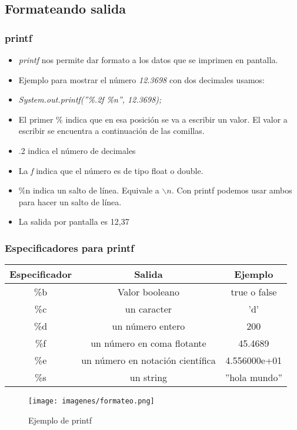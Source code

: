 \documentclass{beamer}
\begin{document}
\subsection{Formateando salida}
\begin{frame}[fragile]
\frametitle{printf}
\begin{itemize}[<+-|alert@+>]
\item \emph{printf} nos permite dar formato a los datos que se imprimen en pantalla.
\item Ejemplo para mostrar el número \emph{12.3698} con dos decimales usamos:
\item \emph{System.out.printf(''\%.2f \%n'', 12.3698);}
\item El primer \% indica que en esa posición se va a escribir un valor. El valor a escribir se encuentra a continuación de las comillas. 
\item .2 indica el número de decimales
\item La \emph{f} indica que el número es de tipo float o double.
\item \%n indica un salto de línea. Equivale a $\backslash n$. Con printf podemos usar ambos para hacer un salto de línea.
\item La salida por pantalla es 12,37
\end{itemize}
\pause
\end{frame}

\begin{frame}
\frametitle{Especificadores para printf}
\begin{tabular}{ccc}
\hline
Especificador & Salida & Ejemplo \\
\hline
\%b &Valor booleano & true o false\\
\%c & un caracter&'d' \\
\%d & un número entero & 200\\
\%f & un número en coma flotante& 45.4689\\
\%e & un número en notación científica & 4.556000e+01\\
\%s & un string&''hola mundo'' \\
\end{tabular}
\pause
\begin{figure}
\texttt{[image: imagenes/formateo.png]}
\caption{Ejemplo de printf}
\end{figure}
\end{frame}
\end{document}
